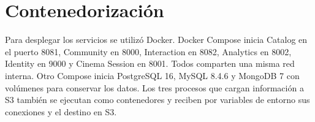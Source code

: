 ﻿\chapter{Contenedorización}
Para desplegar los servicios se utilizó Docker. Docker Compose inicia Catalog en el puerto 8081, Community en 8000, Interaction en 8082, Analytics en 8002, Identity en 9000 y Cinema Session en 8001. Todos comparten una misma red interna.
Otro Compose inicia PostgreSQL 16, MySQL 8.4.6 y MongoDB 7 con volúmenes para conservar los datos. Los tres procesos que cargan información a S3 también se ejecutan como contenedores y reciben por variables de entorno sus conexiones y el destino en S3.
